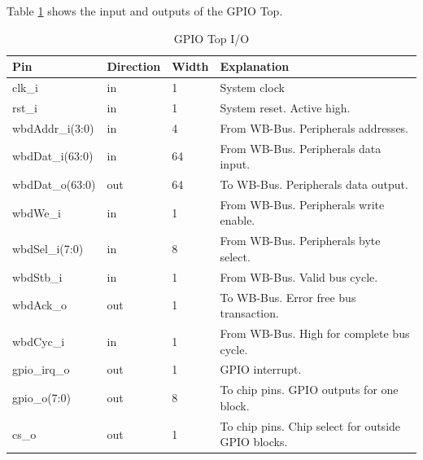 
Table \ref{tab:asGpioPer06} shows the input and outputs of the GPIO Top.
\begin{table}[H]
\caption{GPIO Top I/O}
\label{tab:asGpioPer06}
\centering
\begin{tabularx}{\textwidth}{|l |l |l |X|}
  \hline
  Pin & Direction & Width & Explanation \\
  \hline
  \hline
  clk\_i & in & 1 & System clock \\
  \hline
  rst\_i & in & 1 & System reset. Active high. \\
  \hline
  wbdAddr\_i(3:0) & in & 4 &  From WB-Bus. Peripherals addresses. \\
  \hline
  wbdDat\_i(63:0) & in & 64 &  From WB-Bus. Peripherals data input. \\
  \hline
  wbdDat\_o(63:0) & out & 64 &  To WB-Bus. Peripherals data output. \\
  \hline
  wbdWe\_i & in & 1 &  From WB-Bus. Peripherals write enable. \\
  \hline
  wbdSel\_i(7:0) & in & 8 &  From WB-Bus. Peripherals byte select. \\
  \hline
  wbdStb\_i & in & 1 &  From WB-Bus. Valid bus cycle.  \\
  \hline
  wbdAck\_o & out & 1 &  To WB-Bus. Error free bus transaction.  \\
  \hline
  wbdCyc\_i & in & 1 &  From WB-Bus. High for complete bus cycle.  \\
  \hline
  gpio\_irq\_o & out & 1 &  GPIO interrupt. \\
  \hline
  gpio\_o(7:0) & out & 8 &  To chip pins. GPIO outputs for one block. \\
  \hline
  cs\_o & out & 1 &  To chip pins. Chip select for outside GPIO blocks.   \\
  \hline
\end{tabularx}
\end{table}

